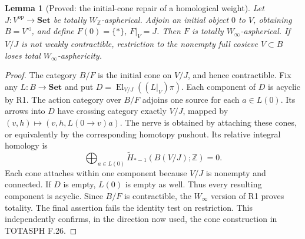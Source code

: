 \documentclass[11pt,a4paper]{article}
\newtheorem{lemma}[theorem]{Lemma}
\theoremstyle{definition}
\theoremstyle{remark}
\newcommand{\Set}{\mathbf{Set}}
\newcommand{\Z}{\mathbb Z}
\newcommand{\op}{\mathrm{op}}
\newcommand{\Winfty}{W_\infty}
\newcommand{\WZ}{W_{\mathbb Z}}
\newcommand{\El}{\operatorname{El}}
\begin{document}
\begin{lemma}[Proved: the initial-cone repair of a homological weight]\label{B:cone}
Let $J:V^{\op}\to\Set$ be totally $\WZ$-aspherical. Adjoin an initial object $0$ to $V$, obtaining $B=V^{\triangleleft}$, and define $F(0)=\{*\}$, $F|_V=J$. Then $F$ is totally $\Winfty$-aspherical. If $V/J$ is not weakly contractible, restriction to the nonempty full cosieve $V\subset B$ loses total $\Winfty$-asphericity.
\end{lemma}
\begin{proof}
The category $B/F$ is the initial cone on $V/J$, and hence contractible. Fix any $L:B\to\Set$ and put $D=\El_{V/J}((L|_V)\pi)$. Each component of $D$ is acyclic by R1. The action category over $B/F$ adjoins one source for each $a\in L(0)$. Its arrows into $D$ have crossing category exactly $V/J$, mapped by $(v,h)\mapsto(v,h,L(0\to v)a)$. The nerve is obtained by attaching these cones, or equivalently by the corresponding homotopy pushout. Its relative integral homology is
\[
 \bigoplus_{a\in L(0)}\widetilde H_{*-1}(B(V/J);\Z)=0.
\]
Each cone attaches within one component because $V/J$ is nonempty and connected. If $D$ is empty, $L(0)$ is empty as well. Thus every resulting component is acyclic. Since $B/F$ is contractible, the $\Winfty$ version of R1 proves totality. The final assertion fails the identity test on restriction. This independently confirms, in the direction now used, the cone construction in TOTASPH F.26.
\end{proof}
\end{document}
